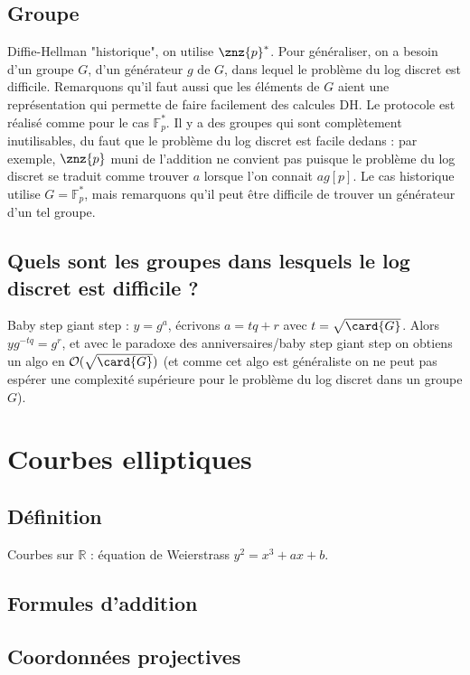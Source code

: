         \subsection{Groupe}
            Diffie-Hellman "historique", on utilise $\znz{p}^*$. Pour généraliser, on a besoin d'un groupe $G$, d'un générateur $g$ de $G$, dans lequel le problème du log discret est difficile. Remarquons qu'il faut aussi que les éléments de $G$ aient une représentation qui permette de faire facilement des calcules DH. Le protocole est réalisé comme pour le cas $\mathbb{F}_p^*$. Il y a des groupes qui sont complètement inutilisables, du faut que le problème du log discret est facile dedans : par exemple, $\znz{p}$ muni de l'addition ne convient pas puisque le problème du log discret se traduit comme trouver $a$ lorsque l'on connait $ag [p]$. Le cas historique utilise $G = \mathbb{F}_p^*$, mais remarquons qu'il peut être difficile de trouver un générateur d'un tel groupe.
            
        \subsection{Quels sont les groupes dans lesquels le log discret est difficile ?}
            \begin{remq}
                Baby step giant step : $y = g^a$, écrivons $a = tq + r$ avec $t = \sqrt{\card{G}}
                $. Alors $yg^{-tq} = g^r$, et avec le paradoxe des anniversaires/baby step giant step on obtiens un algo en $\mathcal{O}(\sqrt{\card{G}})$ (et comme cet algo est généraliste on ne peut pas espérer une complexité supérieure pour le problème du log discret dans un groupe $G$).
            \end{remq}

    \section{Courbes elliptiques}
        \subsection{Définition}
            Courbes sur $\mathbb{R}$ : équation de Weierstrass $y^2 = x^3 + ax + b$. 

        \subsection{Formules d'addition}

        \subsection{Coordonnées projectives}

